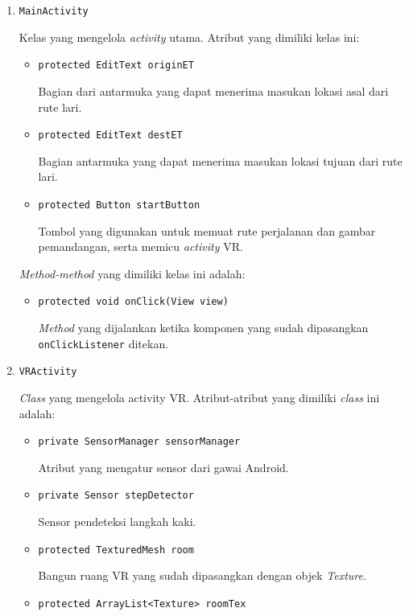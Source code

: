 \begin{enumerate}
	\item \texttt{MainActivity}
	
	Kelas yang mengelola \textit{activity} utama. Atribut yang dimiliki kelas ini:
	
	\begin{itemize}
		\item \texttt{protected EditText originET}
		
		Bagian dari antarmuka yang dapat menerima masukan lokasi asal dari rute lari.
		\item \texttt{protected EditText destET}
		
		Bagian antarmuka yang dapat menerima masukan lokasi tujuan dari rute lari.
		\item \texttt{protected Button startButton}
		
		Tombol yang digunakan untuk memuat rute perjalanan dan gambar pemandangan, serta memicu \textit{activity} VR.
	\end{itemize}
	
	\textit{Method-method} yang dimiliki kelas ini adalah:
	
	\begin{itemize}
		\item \texttt{protected void onClick(View view)}
		
		\textit{Method} yang dijalankan ketika komponen yang sudah dipasangkan \texttt{onClickListener} ditekan. 
		
	\end{itemize}
	\item \texttt{VRActivity}
	
	\textit{Class} yang mengelola activity VR. Atribut-atribut yang dimiliki \textit{class} ini adalah:
	
	\begin{itemize}
		\item \texttt{private SensorManager sensorManager}
		
		Atribut yang mengatur sensor dari gawai Android.
		\item \texttt{private Sensor stepDetector}
		
		Sensor pendeteksi langkah kaki.
		\item \texttt{protected TexturedMesh room}
		
		Bangun ruang VR yang sudah dipasangkan dengan objek \textit{Texture}.
		\item \texttt{protected ArrayList<Texture> roomTex}
		

\end{itemize}
\end{enumerate}
